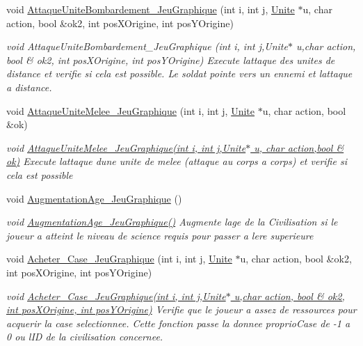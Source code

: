 \begin{DoxyCompactItemize}
void \hyperlink{classJeu__graphique_a0d85885796e5749b14cbcb005209042e}{Attaque\+Unite\+Bombardement\+\_\+\+Jeu\+Graphique} (int i, int j, \hyperlink{classUnite}{Unite} $\ast$u, char action, bool \&ok2, int pos\+X\+Origine, int pos\+Y\+Origine)
\begin{DoxyCompactList}\small\item\em void Attaque\+Unite\+Bombardement\+\_\+\+Jeu\+Graphique (int i, int j,Unite$\ast$ u,char action, bool \& ok2, int pos\+X\+Origine, int pos\+Y\+Origine) Execute l\textquotesingle{}attaque des unites de distance et verifie si cela est possible. Le soldat pointe vers un ennemi et l\textquotesingle{}attaque a distance. \end{DoxyCompactList}\item 
void \hyperlink{classJeu__graphique_aae9e116a4e3651b22ba244957d98e076}{Attaque\+Unite\+Melee\+\_\+\+Jeu\+Graphique} (int i, int j, \hyperlink{classUnite}{Unite} $\ast$u, char action, bool \&ok)
\begin{DoxyCompactList}\small\item\em void \hyperlink{classJeu__graphique_aae9e116a4e3651b22ba244957d98e076}{Attaque\+Unite\+Melee\+\_\+\+Jeu\+Graphique(int i, int j,\+Unite$\ast$ u, char action,bool \& ok)} Execute l\textquotesingle{}attaque d\textquotesingle{}une unite de melee (attaque au corps a corps) et verifie si cela est possible \end{DoxyCompactList}\item 
\mbox{\label{classJeu__graphique_a503fedd073b20734ca16b0950f8b6f7f}} 
void \hyperlink{classJeu__graphique_a503fedd073b20734ca16b0950f8b6f7f}{Augmentation\+Age\+\_\+\+Jeu\+Graphique} ()
\begin{DoxyCompactList}\small\item\em void \hyperlink{classJeu__graphique_a503fedd073b20734ca16b0950f8b6f7f}{Augmentation\+Age\+\_\+\+Jeu\+Graphique()} Augmente l\textquotesingle{}age de la Civilisation si le joueur a atteint le niveau de science requis pour passer a l\textquotesingle{}ere superieure \end{DoxyCompactList}\item 
void \hyperlink{classJeu__graphique_a6686db5a36c47122f36d3fab0255e1b4}{Acheter\+\_\+\+Case\+\_\+\+Jeu\+Graphique} (int i, int j, \hyperlink{classUnite}{Unite} $\ast$u, char action, bool \&ok2, int pos\+X\+Origine, int pos\+Y\+Origine)
\begin{DoxyCompactList}\small\item\em void \hyperlink{classJeu__graphique_a6686db5a36c47122f36d3fab0255e1b4}{Acheter\+\_\+\+Case\+\_\+\+Jeu\+Graphique(int i, int j,\+Unite$\ast$ u,char action, bool \& ok2, int pos\+X\+Origine, int pos\+Y\+Origine)} Verifie que le joueur a assez de ressources pour acquerir la case selectionnee. Cette fonction passe la donnee proprio\+Case de -\/1 a 0 ou l\textquotesingle{}ID de la civilisation concernee. \end{DoxyCompactList}\item 

\end{DoxyCompactItemize}
